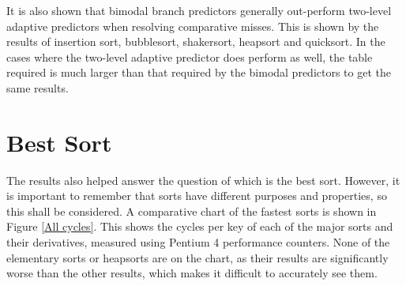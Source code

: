 It is also shown that bimodal branch predictors generally out-perform two-level
adaptive predictors when resolving comparative misses. This is shown by the
results of insertion sort, bubblesort, shakersort, heapsort and quicksort. In
the cases where the two-level adaptive predictor does perform as well, the table
required is much larger than that required by the bimodal predictors to get the
same results.

\section{Best Sort}
The results also helped answer the question of which is the best sort. However,
it is important to remember that sorts have different purposes and properties,
so this shall be considered. A comparative chart of the fastest sorts is shown
in Figure \ref{All cycles}. This shows the cycles per key of each of the major
sorts and their derivatives, measured using Pentium 4 performance counters.
None of the elementary sorts or heapsorts are on the chart, as their results
are significantly worse than the other results, which makes it difficult to
accurately see them.


